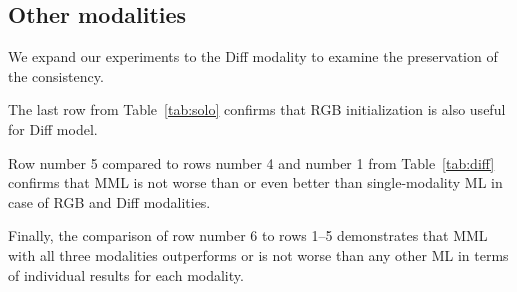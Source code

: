 \documentclass[conference]{IEEEtran}
\begin{document}
\subsection{Other modalities}

We expand our experiments to the Diff modality to examine the preservation of the consistency.

The last row from Table~\ref{tab:solo} confirms that RGB initialization is also useful for Diff model.

Row number 5 compared to rows number 4 and number 1 from Table~\ref{tab:diff} confirms that MML is not worse than or even better than single-modality ML in case of RGB and Diff modalities.

Finally, the comparison of row number 6 to rows 1--5 demonstrates that MML with all three modalities outperforms or is not worse than any other ML in terms of individual results for each modality.
\end{document}
